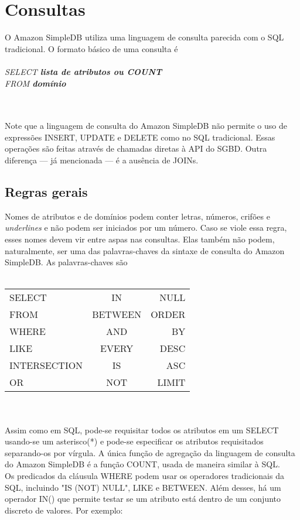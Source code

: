 \section{Consultas}
O Amazon SimpleDB utiliza uma linguagem de consulta parecida com o SQL tradicional. O formato básico de uma consulta é \\
\\ \textit{SELECT \textbf{lista de atributos ou COUNT}}
\\ \textit{FROM \textbf{domínio}} 
\\ 
\\ 
\\ 

Note que a linguagem de consulta do Amazon SimpleDB não permite o uso de expressões INSERT, UPDATE e DELETE como no SQL tradicional. Essas operações são feitas através de chamadas diretas à API do SGBD. Outra diferença --- já mencionada --- é a ausência de JOINs.

\subsection{Regras gerais}
Nomes de atributos e de domínios podem conter letras, números, crifões e \textit{underlines} e não podem ser iniciados por um número. Caso se viole essa regra, esses nomes devem vir entre aspas nas consultas. Elas também não podem, naturalmente, ser uma das palavras-chaves da sintaxe de consulta do Amazon SimpleDB. As palavras-chaves são
\\\\
\begin{tabular}{l c r}
	SELECT & IN & NULL \\
	FROM & BETWEEN & ORDER \\
	WHERE & AND & BY \\
	LIKE & EVERY & DESC \\
	INTERSECTION & IS & ASC \\
	OR & NOT & LIMIT \\
\end{tabular}
\\\\
Assim como em SQL, pode-se requisitar todos os atributos em um SELECT usando-se um asterisco(*) e pode-se especificar os atributos requisitados separando-os por vírgula. A única função de agregação da linguagem de consulta do Amazon SimpleDB é a função COUNT, usada de maneira similar à SQL. 
\\
Os predicados da cláusula WHERE podem usar os operadores tradicionais da SQL, incluindo "IS (NOT) NULL", LIKE e BETWEEN. Além desses, há um operador IN() que permite testar se um atributo está dentro de um conjunto discreto de valores. Por exemplo: \\\\

